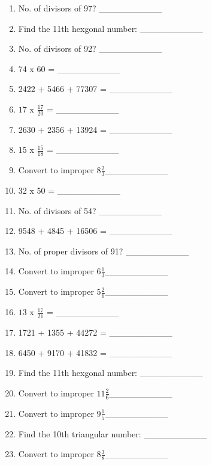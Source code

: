 \documentclass{article}
\begin{document}
\begin{multicols}{2}
\begin{enumerate}
\item No. of divisors of 97? \_\_\_\_\_\_\_\_\_\_ \\ 
\item Find the 11th hexgonal number:  \_\_\_\_\_\_\_\_\_\_ \\ 
\item No. of divisors of 92? \_\_\_\_\_\_\_\_\_\_ \\ 
\item 74 x 60 = \_\_\_\_\_\_\_\_\_\_ \\ 
\item 2422 + 5466 + 77307 = \_\_\_\_\_\_\_\_\_\_ \\ 
\item $17$ x $\frac{17}{20}$ = \_\_\_\_\_\_\_\_\_\_ \\ 
\item 2630 + 2356 + 13924 = \_\_\_\_\_\_\_\_\_\_ \\ 
\item $15$ x $\frac{15}{18}$ = \_\_\_\_\_\_\_\_\_\_ \\ 
\item Convert to improper $8\frac{2}{3}$\_\_\_\_\_\_\_\_\_\_ \\ 
\item 32 x 50 = \_\_\_\_\_\_\_\_\_\_ \\ 
\item No. of divisors of 54? \_\_\_\_\_\_\_\_\_\_ \\ 
\item 9548 + 4845 + 16506 = \_\_\_\_\_\_\_\_\_\_ \\ 
\item No. of proper divisors of 91? \_\_\_\_\_\_\_\_\_\_ \\ 
\item Convert to improper $6\frac{1}{3}$\_\_\_\_\_\_\_\_\_\_ \\ 
\item Convert to improper $5\frac{2}{6}$\_\_\_\_\_\_\_\_\_\_ \\ 
\item $13$ x $\frac{17}{21}$ = \_\_\_\_\_\_\_\_\_\_ \\ 
\item 1721 + 1355 + 44272 = \_\_\_\_\_\_\_\_\_\_ \\ 
\item 6450 + 9170 + 41832 = \_\_\_\_\_\_\_\_\_\_ \\ 
\item Find the 11th hexgonal number:  \_\_\_\_\_\_\_\_\_\_ \\ 
\item Convert to improper $11\frac{2}{6}$\_\_\_\_\_\_\_\_\_\_ \\ 
\item Convert to improper $9\frac{1}{5}$\_\_\_\_\_\_\_\_\_\_ \\ 
\item Find the 10th triangular number:  \_\_\_\_\_\_\_\_\_\_ \\ 
\item Convert to improper $8\frac{3}{8}$\_\_\_\_\_\_\_\_\_\_ \\ 
\end{enumerate}
\end{multicols}
\end{document}
